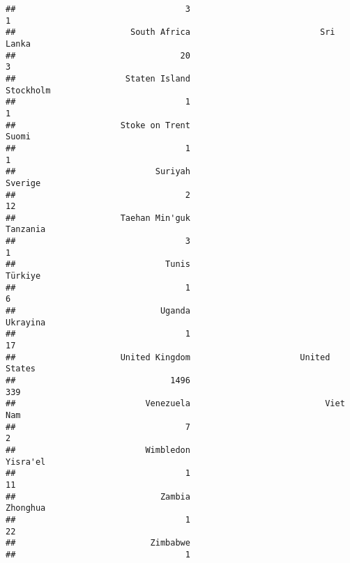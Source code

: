 \documentclass[]{article}
\newenvironment{Shaded}{\begin{snugshade}}{\end{snugshade}}
\newcommand{\DataTypeTok}[1]{\textcolor[rgb]{0.13,0.29,0.53}{#1}}
\newcommand{\DecValTok}[1]{\textcolor[rgb]{0.00,0.00,0.81}{#1}}
\newcommand{\KeywordTok}[1]{\textcolor[rgb]{0.13,0.29,0.53}{\textbf{#1}}}
\newcommand{\NormalTok}[1]{#1}
\newcommand{\OperatorTok}[1]{\textcolor[rgb]{0.81,0.36,0.00}{\textbf{#1}}}
\newcommand{\StringTok}[1]{\textcolor[rgb]{0.31,0.60,0.02}{#1}}
\begin{document}
\begin{verbatim}
##                                  3                                  1 
##                       South Africa                          Sri Lanka 
##                                 20                                  3 
##                      Staten Island                          Stockholm 
##                                  1                                  1 
##                     Stoke on Trent                              Suomi 
##                                  1                                  1 
##                            Suriyah                            Sverige 
##                                  2                                 12 
##                     Taehan Min'guk                           Tanzania 
##                                  3                                  1 
##                              Tunis                            Türkiye 
##                                  1                                  6 
##                             Uganda                           Ukrayina 
##                                  1                                 17 
##                     United Kingdom                      United States 
##                               1496                                339 
##                          Venezuela                           Viet Nam 
##                                  7                                  2 
##                          Wimbledon                           Yisra'el 
##                                  1                                 11 
##                             Zambia                           Zhonghua 
##                                  1                                 22 
##                           Zimbabwe 
##                                  1
\end{verbatim}

\begin{Shaded}
\end{Shaded}
\end{document}
